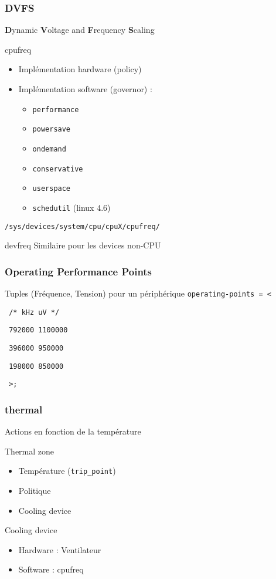 \begin{frame}
	\frametitle{DVFS}
	\textbf{D}ynamic \textbf{V}oltage and \textbf{F}requency \textbf{S}caling
	\begin{block}{cpufreq}
		\begin{itemize}
			\item Implémentation hardware (policy)
			\item Implémentation software (governor) :
				\begin{itemize}
					\item \texttt{performance}
					\item \texttt{powersave}
					\item \texttt{ondemand}
					\item \texttt{conservative}
					\item \texttt{userspace}
					\item \texttt{schedutil} (linux 4.6)
				\end{itemize}
		\end{itemize}
		\texttt{/sys/devices/system/cpu/cpuX/cpufreq/}
	\end{block}
	\begin{block}{devfreq}
		Similaire pour les devices non-CPU
	\end{block}
\end{frame}

\begin{frame}
	\frametitle{Operating Performance Points}
	\begin{block}{Tuples (Fréquence, Tension) pour un périphérique}
	\texttt{operating-points = <}

	\texttt{     /* kHz    uV */}

	\texttt{     792000  1100000}

	\texttt{     396000  950000}

	\texttt{     198000  850000}

	\texttt{     >;}
	\end{block}
\end{frame}
\begin{frame}
	\frametitle{thermal}
	Actions en fonction de la température
	\begin{block}{Thermal zone}
		\begin{itemize}
			\item Température (\texttt{trip\_point})
			\item Politique 
			\item Cooling device
		\end{itemize}
	\end{block}
	\begin{block}{Cooling device}
		\begin{itemize}
			\item Hardware : Ventilateur
			\item Software : cpufreq
		\end{itemize}
	\end{block}
\end{frame}

